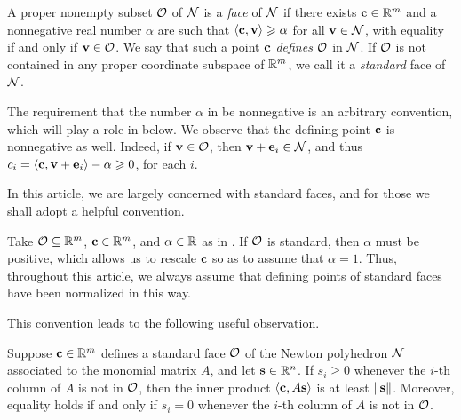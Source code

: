 \documentclass{amsart}
\begin{document}
\begin{definition}[Faces]
   \label{defn: face}
   A proper nonempty subset $\mathcal{O}$ of $\mathcal{N}$ is a \emph{face} of $\mathcal{N}$ if there exists $\mathbf{c} \in \mathbb{R}^m$ and a nonnegative real number $\alpha$ are such that $\langle \mathbf{c}, \mathbf{v} \rangle \geqslant \alpha$ for all $\mathbf{v} \in \mathcal{N}$, with equality if and only if $\mathbf{v} \in \mathcal{O}$.
   We say that such a point $\mathbf{c}$ \emph{defines} $\mathcal{O}$ in $\mathcal{N}$.
   If $\mathcal{O}$ is not contained in any proper coordinate subspace of $\mathbb{R}^m$, we call it a \emph{standard} face of $\mathcal{N}$.
\end{definition}

\begin{remark}
   \label{rmk: nonnegativity of defining point}
   The requirement that the number $\alpha$ in  be nonnegative is an arbitrary convention, which will play a role in  below.
   We observe that the defining point $\mathbf{c}$ is nonnegative as well.
   Indeed, if $\mathbf{v} \in \mathcal{O}$, then $\mathbf{v} + \mathbf{e}_i \in \mathcal{N}$, and thus $c_i = \langle \mathbf{c}, \mathbf{v} + \mathbf{e}_i \rangle -\alpha \geqslant 0$, for each $i$.
\end{remark}

In this article, we are largely concerned with standard faces, and for those we shall adopt a helpful convention.

\begin{convention}
\label{alpha=1: convention}
Take $\mathcal{O} \subseteq \mathbb{R}^m$, $\mathbf{c} \in \mathbb{R}^m$, and $\alpha \in \mathbb{R}$ as in .
If $\mathcal{O}$ is standard, then $\alpha$ must be positive, which allows us to rescale $\mathbf{c}$ so as to assume that $\alpha = 1$.
Thus, throughout this article, we always assume that defining points of standard faces have been normalized in this way.
\end{convention}

This convention leads to the following useful observation.

\begin{proposition}\label{prop: inner product with columns of A}
   Suppose $\mathbf{c} \in \mathbb{R}^m$ defines a standard face $\mathcal{O}$ of the Newton polyhedron $\mathcal{N}$ associated to the monomial matrix $A$, and let $\mathbf{s} \in \mathbb{R}^n$.
   If $s_i \ge 0$ whenever the $i$-th column of $A$ is not in $\mathcal{O}$, then the inner product $\langle \mathbf{c}, A\mathbf{s} \rangle$ is at least $\| \mathbf{s} \|$.
   Moreover, equality holds if and only if $s_i = 0$ whenever the $i$-th column of $A$ is not in $\mathcal{O}$.
\end{proposition}
\end{document}
